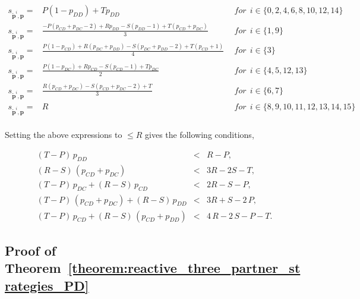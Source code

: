 \documentclass[11pt]{article}
\theoremstyle{plainCl1}
\theoremstyle{plainCl2}
\begin{document}
\begin{equation*}
  \begin{array}{lcl}
  s_{\mathbf{\tilde{p}}^{i}, \mathbf{p}} = & P (1 - p_{DD}) + T p_{DD} & ~~for~~ i \in \{0, 2, 4, 6, 8, 10, 12, 14\} \\ [0.3cm]
  s_{\mathbf{\tilde{p}}^{i}, \mathbf{p}} = & \frac{-P(p_{CD} + p_{DC} - 2) + Rp_{DD} - S(p_{DD} - 1) + T(p_{CD} + p_{DC})}{3} & ~~for~~ i \in \{1, 9\} \\ [0.3cm]
  s_{\mathbf{\tilde{p}}^{i}, \mathbf{p}} = & \frac{P(1 - p_{CD}) + R(p_{DC} + p_{DD}) - S(p_{DC} + p_{DD} - 2) + T(p_{CD} + 1)}{4} & ~~for~~ i \in \{3\} \\ [0.3cm]
  s_{\mathbf{\tilde{p}}^{i}, \mathbf{p}} = & \frac{P(1 - p_{DC}) + Rp_{CD} - S(p_{CD} - 1) + Tp_{DC}}{2} & ~~for~~ i \in \{4, 5, 12, 13\} \\ [0.3cm]
  s_{\mathbf{\tilde{p}}^{i}, \mathbf{p}} = & \frac{R(p_{CD} + p_{DC}) - S(p_{CD} + p_{DC} - 2) + T}{3} & ~~for~~ i \in \{6, 7\} \\ [0.3cm]
  s_{\mathbf{\tilde{p}}^{i}, \mathbf{p}} = & R & ~~for~~ i \in \{8, 9, 10, 11, 12, 13, 14, 15\} \\ [0.3cm]
\end{array}
\end{equation*}

Setting the above expressions to $\leq R$ gives the following conditions,

\begin{equation*}
  \begin{array}{ccc}
    (T - P)\, p_{DD} & < & R - P, \\ [0.2cm]
    (R - S)\, (p_{CD} + p_{DC}) & < & 3 R - 2 S - T, \\ [0.2cm]
    (T - P)\, p_{DC}  + (R - S)\, p_{CD} & < & 2 R - S - P, \\ [0.2cm]
    (T - P)\, (p_{CD} + p_{DC}) + (R - S)\, p_{DD}  & < & 3 R + S - 2\,P, \\ [0.2cm]
    (T - P)\, p_{CD}  + (R - S)\, (p_{CD} + p_{DD}) & < & 4\,R - 2\,S - P - T.
\end{array}
\end{equation*}


\subsection{Proof of Theorem~\ref{theorem:reactive_three_partner_strategies_PD}}\label{appendix:reactive_three_pure_self_reactive_pd}
\end{document}
